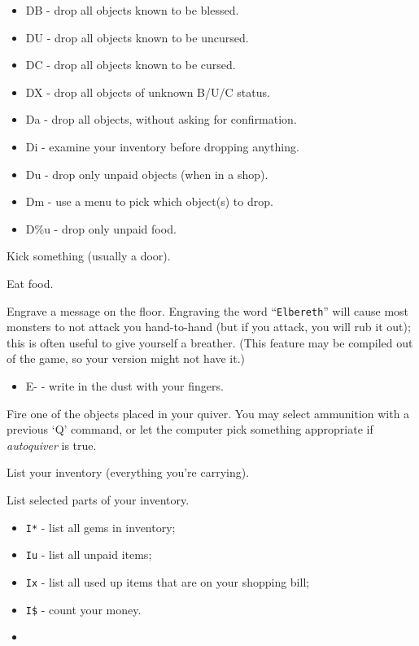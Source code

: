 \begin{itemize}
\item DB  - drop all objects known to be blessed.
\item DU  - drop all objects known to be uncursed.
\item DC  - drop all objects known to be cursed.
\item DX  - drop all objects of unknown B/U/C status.
\item Da  - drop all objects, without asking for confirmation.
\item Di  - examine your inventory before dropping anything.
\item Du  - drop only unpaid objects (when in a shop).
\item Dm  - use a menu to pick which object(s) to drop.
\item D\%u - drop only unpaid food.
\end{itemize}
\item[\tb{\^D}]
Kick something (usually a door).
\item[\tb{e}]
Eat food.
\item[\tb{E}]
Engrave a message on the floor.
Engraving the word ``{\tt Elbereth}'' will cause most monsters to not attack
you hand-to-hand (but if you attack, you will rub it out); this is
often useful to give yourself a breather.  (This feature may be compiled out
of the game, so your version might not have it.)
\begin{itemize}
\item E- - write in the dust with your fingers.  
\end{itemize}
\item[\tb{f}]
Fire one of the objects placed in your quiver.  You may select
ammunition with a previous `Q' command, or let the computer pick
something appropriate if
{\it autoquiver }
is true.
\item[\tb{i}]
List your inventory (everything you're carrying).
\item[\tb{I}]
List selected parts of your inventory.
\item \begin{itemize}
\item {\tt I*} - list all gems in inventory;
\item {\tt Iu} - list all unpaid items;
\item {\tt Ix} - list all used up items that are on your shopping bill;
\item {\tt I\$} - count your money.
\item \end{itemize}
